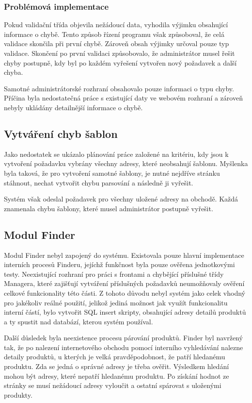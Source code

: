 \documentclass[thesis=B,czech]{FITthesis}[2012/06/26]
\begin{document}
\subsubsection{Problémová implementace}
Pokud validační třída objevila nežádoucí data, vyhodila výjimku obsahující informace o chybě. Tento způsob řízení programu však způsoboval, že celá validace skončila při první chybě. Zároveň obsah výjimky určoval pouze typ validace. 
Skončení po první validaci způsobovalo, že administrátor musel řešit chyby postupně, kdy byl po každém vyřešení
vytvořen nový požadavek a další chyba.
\par
Samotné administrátorské rozhraní obsahovalo pouze informaci o typu chyby. Příčina byla nedostatečná práce s existující daty ve webovém rozhraní
a zároveň nebyly ukládány detailnější informace o chybě. 

\subsection{Vytváření chyb šablon}
Jako nedostatek se ukázalo plánování práce založené na kritériu, kdy jsou k vytvoření požadavku vybrány všechny adresy, které neobsahují šablonu.
Myšlenka byla taková, že pro vytvoření samotné šablony, je nutné nejdříve stránku stáhnout, nechat vytvořit chybu parsování
a následně ji vyřešit.
\par
Systém však odeslal požadavek pro všechny uložené adresy na obchodě. Každá znamenala chybu šablony, které musel administrátor postupně vyřešit.

\subsection{Modul Finder}
Modul Finder nebyl zapojený do systému. Existovala pouze hlavní implementace interních procesů Finderu, jejíchž funkčnost byla
pouze ověřena jednotkovými testy. Neexistující rozhraní pro práci s frontami a chybějící příslušné třídy Managera, které zajišťují vytváření příslušných požadavků neumožňovaly ověření celkové funkcionality této části. Z tohoto důvodu nebyl systém jako celek vhodný pro jakékoliv reálné použití, jelikož
jediná možnost jak využít funkcionalitu interní částí, bylo vytvořit SQL insert skripty, obsahující adresy detailů produktů
a ty spustit nad databází, kterou systém používal.
\par
Další důsledek byla neexistence procesu párování produktů. Finder byl navržený tak, že po nalezení internetového obchodu
pomocí interního vyhledávání nalezne detaily produktů, u kterých je velká pravděpodobnost, že patří hledanému produktu.
Zda se jedná o správné adresy je třeba ověřit. Výsledkem hledání mohou být adresy, které nepatří hledanému produktu. Po získání hodnot ze stránky se musí nežádoucí adresy vyloučit a ostatní spárovat s uloženými produkty.
\end{document}
